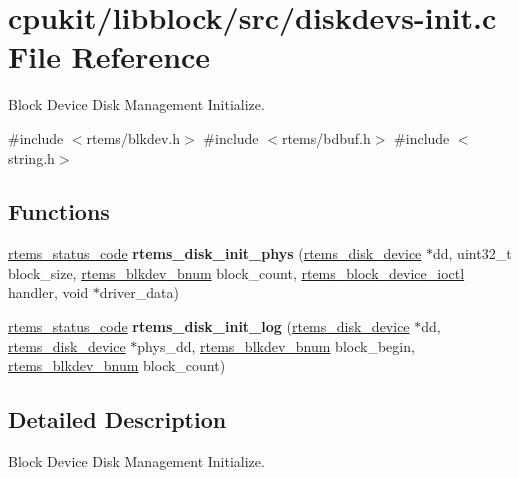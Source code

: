 \hypertarget{diskdevs-init_8c}{}\section{cpukit/libblock/src/diskdevs-\/init.c File Reference}
\label{diskdevs-init_8c}


Block Device Disk Management Initialize.  


{\ttfamily \#include $<$rtems/blkdev.\+h$>$}\newline
{\ttfamily \#include $<$rtems/bdbuf.\+h$>$}\newline
{\ttfamily \#include $<$string.\+h$>$}\newline
\subsection*{Functions}
\begin{DoxyCompactItemize}
\item 
\mbox{\label{diskdevs-init_8c_a7d51281a91b871283c31b8a6a48aeb24}} 
\mbox{\hyperlink{group__ClassicStatus_ga545d41846817eaba6143d52ee4d9e9fe}{rtems\+\_\+status\+\_\+code}} {\bfseries rtems\+\_\+disk\+\_\+init\+\_\+phys} (\mbox{\hyperlink{structrtems__disk__device}{rtems\+\_\+disk\+\_\+device}} $\ast$dd, uint32\+\_\+t block\+\_\+size, \mbox{\hyperlink{group__rtems__disk_ga5fbcfd40b657bff6c54d9e393fab3274}{rtems\+\_\+blkdev\+\_\+bnum}} block\+\_\+count, \mbox{\hyperlink{group__rtems__disk_gacbf717f10129b976deaf8e6f4deb17ad}{rtems\+\_\+block\+\_\+device\+\_\+ioctl}} handler, void $\ast$driver\+\_\+data)
\item 
\mbox{\label{diskdevs-init_8c_a9b28528b9c9049f3c934c1ecabc88d95}} 
\mbox{\hyperlink{group__ClassicStatus_ga545d41846817eaba6143d52ee4d9e9fe}{rtems\+\_\+status\+\_\+code}} {\bfseries rtems\+\_\+disk\+\_\+init\+\_\+log} (\mbox{\hyperlink{structrtems__disk__device}{rtems\+\_\+disk\+\_\+device}} $\ast$dd, \mbox{\hyperlink{structrtems__disk__device}{rtems\+\_\+disk\+\_\+device}} $\ast$phys\+\_\+dd, \mbox{\hyperlink{group__rtems__disk_ga5fbcfd40b657bff6c54d9e393fab3274}{rtems\+\_\+blkdev\+\_\+bnum}} block\+\_\+begin, \mbox{\hyperlink{group__rtems__disk_ga5fbcfd40b657bff6c54d9e393fab3274}{rtems\+\_\+blkdev\+\_\+bnum}} block\+\_\+count)
\end{DoxyCompactItemize}


\subsection{Detailed Description}
Block Device Disk Management Initialize. 

